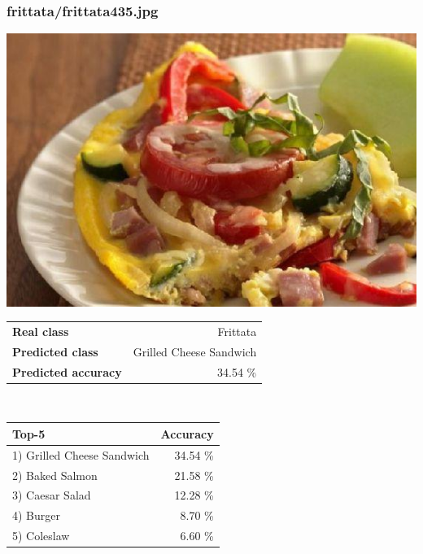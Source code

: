 \subsubsection{frittata/frittata435.jpg}

\begin{minipage}[t]{0.4\textwidth}
	\vspace{0pt}
	\includegraphics[width=\linewidth]{images/evaluation-images/frittata/frittata435.jpg}
\end{minipage}
\hfill
\begin{minipage}[t]{0.5\textwidth}
	\vspace{0pt}\raggedright
	\begin{tabularx}{\textwidth}{X r}
		\small \textbf{Real class} & \small Frittata\\
		\small \textbf{Predicted class} & \small Grilled Cheese Sandwich\\
		\small \textbf{Predicted accuracy} & \small 34.54 \%
    \end{tabularx}\\
    
    \vspace{6pt}
	\begin{tabularx}{\textwidth}{X r}
        \small \textbf{Top-5} & \small \textbf{Accuracy} \\
        \hline
		\small 1) Grilled Cheese Sandwich & \small 34.54 \%\\\small 2) Baked Salmon & \small 21.58 \%\\\small 3) Caesar Salad & \small 12.28 \%\\\small 4) Burger & \small 8.70 \%\\\small 5) Coleslaw & \small 6.60 \%
    \end{tabularx}
\end{minipage}
    
